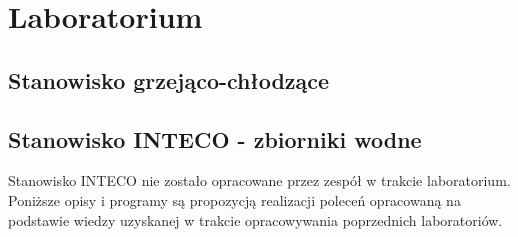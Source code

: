 \documentclass[a4paper,titlepage,11pt,twosides,floatssmall]{mwrep}
\begin{document}
\chapter{Laboratorium}

\lstset{style=customc}
\section{Stanowisko grzejąco-chłodzące}







\section{Stanowisko INTECO - zbiorniki wodne}
Stanowisko INTECO nie zostało opracowane przez zespół
w trakcie laboratorium. Poniższe opisy i programy są
propozycją realizacji poleceń opracowaną na podstawie wiedzy 
uzyskanej w trakcie opracowywania poprzednich laboratoriów.








\end{document}
